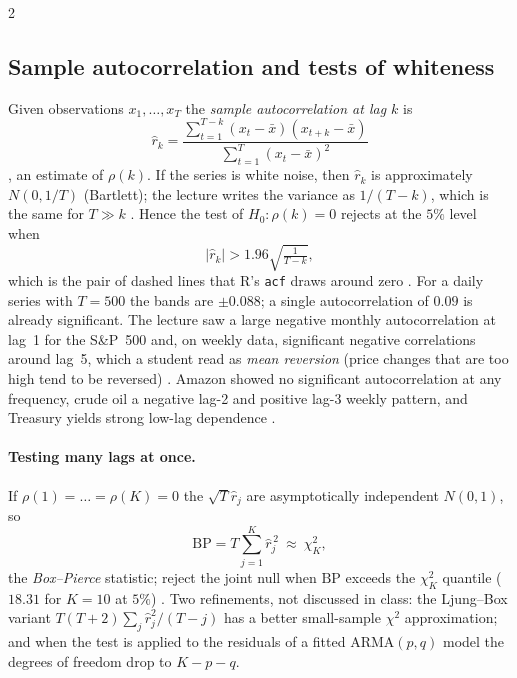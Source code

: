\begin{paracol}{2}
\subsection{Sample autocorrelation and tests of whiteness}\label{ch09:sec-sacf}
Given observations $x_1,\dots,x_T$ the \emph{sample autocorrelation at lag $k$} is
\begin{equation}\label{ch09:eq-sacf}
  \hat r_k=\frac{\sum_{t=1}^{T-k}(x_t-\bar x)(x_{t+k}-\bar x)}{\sum_{t=1}^{T}(x_t-\bar x)^2}
\end{equation}
, an estimate of $\rho(k)$. If the series is white noise, then $\hat r_k$ is
approximately $N(0,1/T)$ (Bartlett); the lecture writes the variance as $1/(T-k)$, which is the same for
$T\gg k$ . Hence the test of $H_0:\rho(k)=0$ rejects at the $5\%$ level when
\begin{equation}\label{ch09:eq-band}
  |\hat r_k|>1.96\sqrt{\tfrac1{T-k}},
\end{equation}
which is the pair of dashed lines that R's \texttt{acf} draws around zero . For
a daily series with $T=500$ the bands are $\pm0.088$; a single autocorrelation of $0.09$ is
already significant. The lecture saw a large negative monthly autocorrelation at lag~1 for the
S\&P~500 and, on weekly data, significant negative correlations around lag~5, which
a student read as \emph{mean reversion} (price changes that are too high tend to be reversed)
. Amazon showed no significant autocorrelation at any frequency, crude oil a negative
lag-2 and positive lag-3 weekly pattern, and Treasury yields strong low-lag dependence
.

\paragraph{Testing many lags at once.} If $\rho(1)=\dots=\rho(K)=0$ the $\sqrt T\hat r_j$ are
asymptotically independent $N(0,1)$, so
\begin{equation}\label{ch09:eq-bp}
  \mathrm{BP}=T\sum_{j=1}^{K}\hat r_j^{\,2}\ \approx\ \chi^2_K ,
\end{equation}
the \emph{Box--Pierce} statistic; reject the joint null when $\mathrm{BP}$ exceeds the $\chi^2_K$
quantile ($18.31$ for $K=10$ at $5\%$) . Two refinements, not
discussed in class: the Ljung--Box variant $T(T+2)\sum_j\hat r_j^2/(T-j)$ has a better small-sample
$\chi^2$ approximation; and when the test is applied to the residuals of a fitted ARMA$(p,q)$ model the
degrees of freedom drop to $K-p-q$.


\end{paracol}
